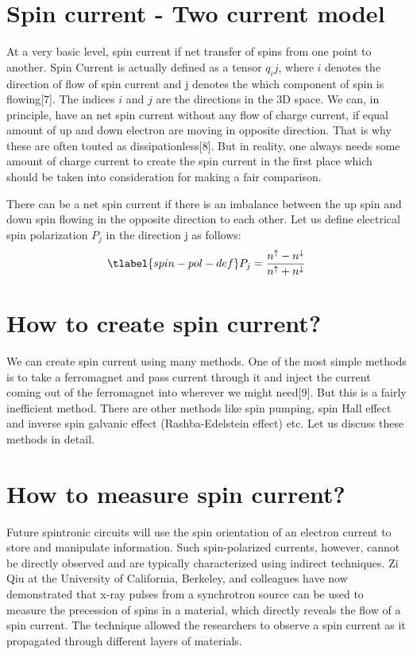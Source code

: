 \label{spintronics-and-quantum-materials}

\section{Spin current - Two current model}
At a very basic level, spin current if net transfer of spins from one point to another. 
Spin Current is actually defined as a tensor $q_ij$, where $i$ denotes the direction of 
flow of spin current and j denotes the which component of spin is flowing[7]. The indices 
$i$ and $j$ are the directions in the 3D space. We can, in principle, have an net spin current
without any flow of charge current, if equal amount of up and down electron are moving in 
opposite direction. That is why these are often touted as dissipationless[8]. But in reality, 
one always needs some amount of charge current to create the spin current in the first place 
which should be taken into consideration for making a fair comparison.

There can be a net spin current if there is an imbalance between the up spin and down spin 
flowing in the opposite direction to each other. Let us define electrical spin polarization 
$P_j$ in the direction j as follows:
\begin{equation}
    \centering
    \tlabel{spin-pol-def}
    P_j=\frac{n^{\uparrow}-n^{\downarrow}}{n^{\uparrow}+n^{\downarrow}}
\end{equation}



\section{How to create spin current?}

We can create spin current using many methods. One of the most simple methods is to take 
a ferromagnet and pass current through it and inject the current coming out of the 
ferromagnet into wherever we might need[9]. But this is a fairly inefficient method. 
There are other methods like spin pumping, spin Hall effect and inverse spin galvanic 
effect (Rashba-Edelstein effect) etc. Let us discuss these methods in detail.

\section{How to measure spin current?}

Future spintronic circuits will use the spin orientation of an electron current to store and manipulate information. Such spin-polarized currents, however, cannot be directly observed and are typically characterized using indirect techniques. Zi Qiu at the University of California, Berkeley, and colleagues have now demonstrated that x-ray pulses from a synchrotron source can be used to measure the precession of spins in a material, which directly reveals the flow of a spin current. The technique allowed the researchers to observe a spin current as it propagated through different layers of materials.

